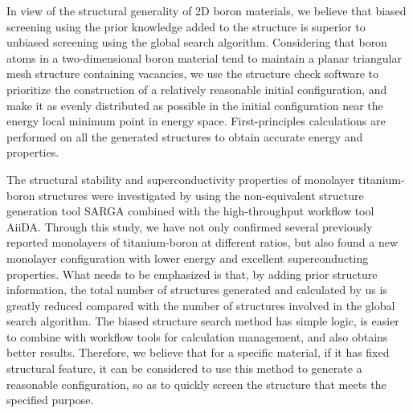 \documentclass[phd,nobackinfo]{scutthesis}
\begin{document}
\begin{englishabstract}
In view of the structural generality of 2D boron materials, we believe that biased screening using the prior knowledge added to the structure is superior to unbiased screening using the global search algorithm. Considering that boron atoms in a two-dimensional boron material tend to maintain a planar triangular mesh structure containing vacancies, we use the structure check software to prioritize the construction of a relatively reasonable initial configuration, and make it as evenly distributed as possible in the initial configuration near the energy local minimum point in energy space. First-principles calculations are performed on all the generated structures to obtain accurate energy and properties.

The structural stability and superconductivity properties of monolayer titanium-boron structures were investigated by using the non-equivalent structure generation tool SARGA combined with the high-throughput workflow tool AiiDA.
Through this study, we have not only confirmed several previously reported monolayers of titanium-boron at different ratios, but also found a new  monolayer configuration with lower energy and excellent superconducting properties. What needs to be emphasized is that, by adding prior structure information, the total number of structures generated and calculated by us is greatly reduced compared with the number of structures involved in the global search algorithm. The biased structure search method has simple logic, is easier to combine with workflow tools for calculation management, and also obtains better results. Therefore, we believe that for a specific material, if it has fixed structural feature, it can be considered to use this method to generate a reasonable configuration, so as to quickly screen the structure that meets the specified purpose.
\end{englishabstract}
\end{document}
